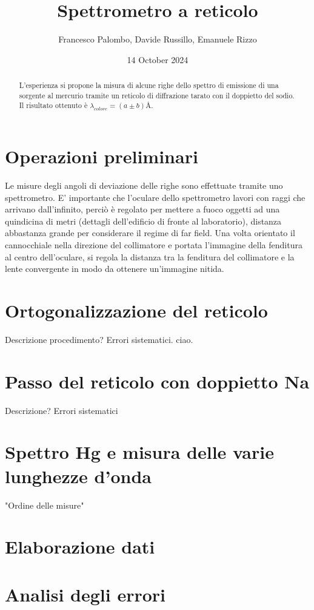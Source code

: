 \documentclass{article}
\title{Spettrometro a reticolo}
\author{Francesco Palombo, Davide Russillo, Emanuele Rizzo}
\date{14 October 2024}
\begin{document}
\maketitle

\begin{abstract}
    L'esperienza si propone la misura di alcune righe dello spettro di emissione di una sorgente al mercurio tramite un reticolo di diffrazione tarato con il doppietto del sodio. Il risultato ottenuto è $\lambda_{colore} = ( a \pm b ) \si{\angstrom}$.
\end{abstract}

\section{Operazioni preliminari}
Le misure degli angoli di deviazione delle righe sono effettuate tramite uno spettrometro. E' importante che l'oculare dello spettrometro lavori con raggi che arrivano dall'infinito, perciò è regolato per mettere a fuoco oggetti ad una quindicina di metri (dettagli dell'edificio di fronte al laboratorio), distanza abbastanza grande per considerare il regime di far field. Una volta orientato il cannocchiale nella direzione del collimatore e portata l'immagine della fenditura al centro dell'oculare, si regola la distanza tra la fenditura del collimatore e la lente convergente in modo da ottenere un'immagine nitida.

\section{Ortogonalizzazione del reticolo}
Descrizione procedimento?
Errori sistematici. ciao.

\section{Passo del reticolo con doppietto Na}
Descrizione?
Errori sistematici

\section{Spettro Hg e misura delle varie lunghezze d'onda}
"Ordine delle misure"

\section{Elaborazione dati}

\section{Analisi degli errori}
\end{document}
